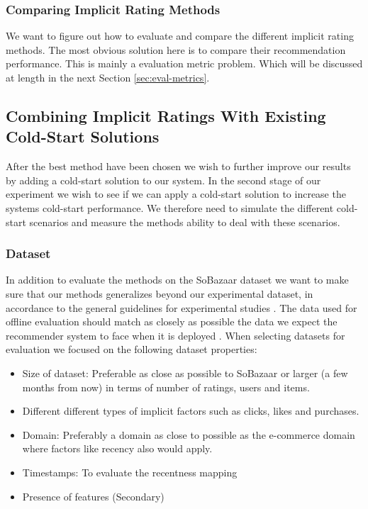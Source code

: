 \subsubsection{Comparing Implicit Rating Methods}

We want to figure out how to evaluate and compare the different implicit rating
methods.  The most obvious solution here is to compare their recommendation performance. This is
mainly a evaluation metric problem. Which will be discussed at length in the
next Section \ref{sec:eval-metrics}.

\subsection{Combining Implicit Ratings With Existing Cold-Start Solutions}


After the best method have been chosen we wish to further improve our results
by adding a cold-start solution to our system. In the second stage of our
experiment we wish to see if we can apply a cold-start solution to increase the
systems cold-start performance. We therefore need to simulate the different cold-start
scenarios and measure the methods ability to deal with these scenarios.

\subsubsection{Dataset}

In addition to evaluate the methods on the SoBazaar dataset we want to make sure that our
methods generalizes beyond our experimental dataset, in accordance to the general guidelines
for experimental studies \cite{Shani2011}. The data used for offline evaluation should match
as closely as possible the data we expect the recommender system to face when it is
deployed \cite{Gunawardana2009}. When selecting datasets for evaluation we focused on the
following dataset properties:

\begin{itemize}
	\item Size of dataset: Preferable as close as possible to SoBazaar or larger (a few months from now)
	in terms of number of ratings, users and items.
	\item Different different types of implicit factors	such as clicks, likes and purchases.
	\item Domain: Preferably a domain as close to possible as the e-commerce domain where
	factors like recency also would apply.
	\item Timestamps: To evaluate the recentness mapping
	\item Presence of features (Secondary)
\end{itemize}

